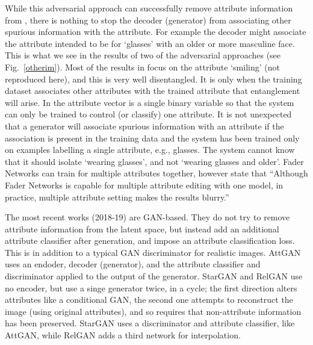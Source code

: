 \documentclass{article}
\begin{document}
While this adversarial approach can successfully remove attribute information from , there is nothing to stop the decoder (generator) from associating other spurious information with the attribute. For example the decoder might associate the attribute intended to be for `glasses' with an older or more masculine face. This is what we see in the results of two of the adversarial approaches (see Fig.~\ref{otherim}). 
Most of the results in \citet{CreswellCondVAE-info} focus on the attribute `smiling' (not reproduced here), and this is very well disentangled. It is only when the training dataset associates other attributes with the trained attribute that entanglement will arise.
In \citet{CreswellCondVAE-info} the attribute vector is a single binary variable so that the system can only be trained to control (or classify) one attribute. 
It is not unexpected that a generator will associate spurious information with an attribute if the association is present in the training data and the system has  been trained only on examples labelling a single attribute, e.g., glasses. 
 The system cannot know that it should isolate `wearing glasses', and not `wearing glasses and older'.
Fader Networks  \cite{NIPS2017_7178}  can train for multiple attributes together, however
\citet{attgan} state that ``Although
Fader Networks is capable for multiple attribute editing
with one model, in practice, multiple attribute setting makes
the results blurry.''



The most recent works (2018-19) are GAN-based. They do not try to remove attribute information from the latent space, but instead add an additional attribute classifier after generation, and impose an attribute classification loss. This is in addition to a typical GAN discriminator for realistic images.
AttGAN  \cite{attgan} uses an endoder, decoder (generator), and the attribute classifier and discriminator applied to the output of the generator.
StarGAN  \cite{StarGAN} and RelGAN \cite{relGAN} use no encoder, but use a singe generator twice, in a cycle; the first direction alters attributes like a conditional GAN, the second one attempts to reconstruct the image (using original attributes), and so requires that non-attribute information has been preserved. StarGAN uses a  discriminator and attribute classifier, like AttGAN, while 
RelGAN adds a third network for interpolation.
\end{document}
